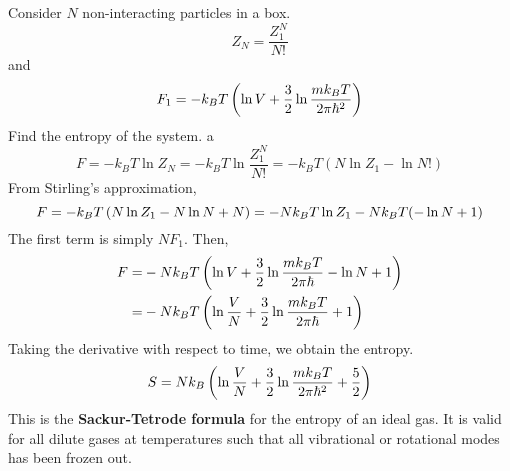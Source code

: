    \begin{problem}{Consider $N$ non-interacting particles in a box. \begin{equation}
        Z_N = \frac{Z_1^N}{N!}
    \end{equation}
    and 
    \begin{equation}
        F_1 = -k_BT\left( \ln V + \frac{3}{2}\ln\frac{mk_BT}{2\pi\hbar^2} \right)
    \end{equation}
    Find the entropy of the system.}
    a\begin{equation}
        F = -k_BT\ln Z_N = -k_BT\ln\frac{Z_1^N}{N!} = -k_BT(N\ln Z_1-\ln N!)
    \end{equation}
    From Stirling's approximation,
    \begin{equation}
        F = -k_BT\left( N\ln Z_1 -N\ln N + N \right) = -Nk_BT\ln Z_1 -Nk_BT(-\ln N + 1)
    \end{equation}
    The first term is simply $NF_1$. Then,
    \begin{align}
        F =& -Nk_BT\left( \ln V + \frac{3}{2}\ln\frac{mk_BT}{2\pi\hbar}-\ln N +1 \right)\notag\\
        =& -Nk_BT\left( \ln\frac{V}{N}+\frac{3}{2}\ln\frac{mk_BT}{2\pi\hbar}+1 \right)
    \end{align}
    Taking the derivative with respect to time, we obtain the entropy.
    \begin{equation}
        S = Nk_B\left( \ln\frac{V}{N}+\frac{3}{2}\ln\frac{mk_BT}{2\pi\hbar^2}+\frac{5}{2} \right)
    \end{equation}
    This is the \textbf{Sackur-Tetrode formula} for the entropy of an ideal gas. It is valid for all dilute gases at temperatures such that all vibrational or rotational modes has been frozen out. 
    \end{problem}
    


